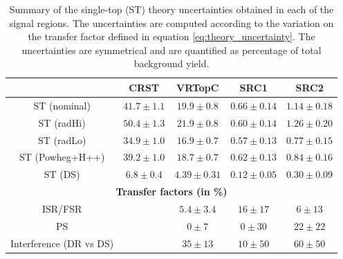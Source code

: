    \begin{table}[!h]
    \caption{Summary of the single-top (ST) theory uncertainties obtained in each of the signal regions. The uncertainties are computed according to the variation on the transfer factor defined in equation \ref{eq:theory_uncertainty}. The uncertainties are symmetrical and are quantified as percentage of total background yield. %
}
    \label{tab:single_top_unc3}
    
    \begin{center}%

       \begin{tabular}{|c|c|c|c|c|}
       \noalign{\smallskip}\noalign{\smallskip}\hline
        & CRST & VRTopC & SRC1 & SRC2 \\ \hline
         \hline
          ST (nominal) &          $41.7\pm 1.1$ &         $19.9\pm 0.8$ &          $0.66\pm 0.14$&         $1.14\pm 0.18$\\
          ST (radHi)&   $50.4\pm 1.3$ &         $21.9\pm 0.8$ &          $0.60\pm 0.14$&         $1.26\pm 0.20$\\
ST  (radLo)&   $34.9\pm 1.0$ &         $16.9\pm 0.7$ &          $0.57\pm 0.13$&         $0.77\pm 0.15$\\
ST (Powheg+H++)&       $39.2\pm 1.0$ &         $18.7\pm 0.7$ &          $0.62\pm 0.13$&         $0.84\pm 0.16$\\
ST  (DS)&       $6.8\pm 0.4$ &       $4.39\pm 0.31$ &   $0.12\pm 0.05$&         $0.30\pm 0.09$\\
          \hline \hline 
          \multicolumn{5}{c}{\bf Transfer factors (in \%)} \\ \hline
          ISR/FSR& &      $5.4\pm3.4$&       $16\pm17$&      $6\pm13$\\
          PS &  &      $0\pm7$ &     $0\pm30$&       $22\pm22$\\
          Interference (DR vs DS) &  &      $35\pm13$ &      $10\pm50$&      $60\pm50$\\
          \hline
        \end{tabular}


\end{center}
\end{table}

